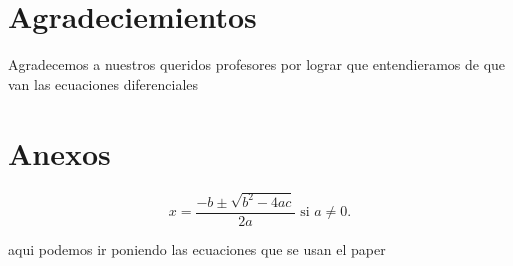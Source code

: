 \documentclass{wscpaperproc}
\theoremstyle{wsc}
\begin{document}

\printbibliography[heading=Referencias, nottype=book]
\printbibliography[heading=Bibliografía, nottype=article]
\nocite{edwards_differential_2008}


\section*{Agradeciemientos}
Agradecemos a nuestros queridos profesores por lograr que entendieramos de que van las ecuaciones diferenciales

\appendix

\section{Anexos} \label{app:quadratic}

\begin{equation} \label{eq:quadraticsol}
	x = \frac{-b \pm \sqrt{b^2-4ac}}{2a} \mbox{ si } a \ne 0.
\end{equation}

aqui podemos ir poniendo las ecuaciones que se usan el paper
\end{document}
